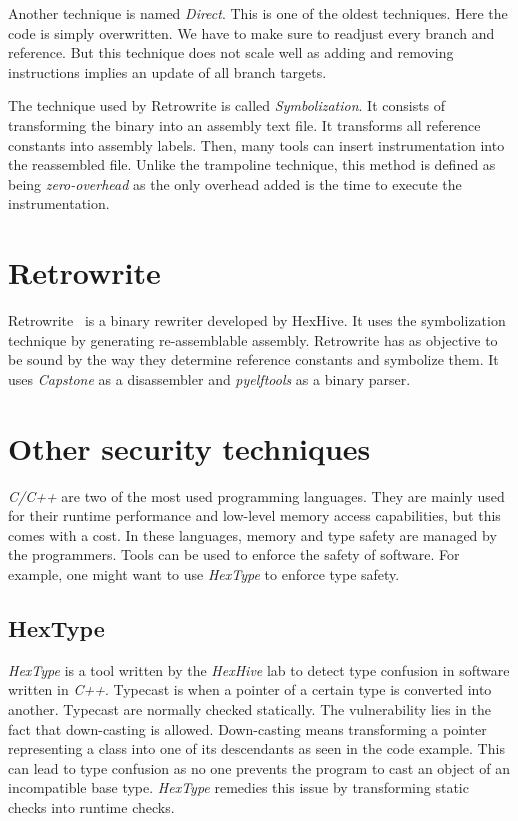 \documentclass[a4paper,11pt,oneside]{report}
\newcommand{\sysname}{Retrowrite\xspace}
\begin{document}
Another technique is named \textit{Direct}. This is one of the oldest
techniques. Here the code is simply overwritten. We have to make sure to readjust
every branch and reference.  But this technique does not scale well as adding
and removing instructions implies an update of all branch targets.


The technique used by \sysname is called \textit{Symbolization}. It
consists of transforming the binary into an assembly text file. It transforms
all reference constants into assembly labels. Then, many tools can insert
instrumentation into the reassembled file. Unlike the trampoline technique,
this method is defined as being \textit{zero-overhead} as the only overhead
added is the time to execute the instrumentation.


\section{Retrowrite}
Retrowrite~\cite{dinesh20oakland} is a binary rewriter developed by HexHive.
It uses the symbolization technique by generating re-assemblable assembly.
Retrowrite has as objective to be sound by the way they determine reference
constants and symbolize them. It uses
\textit{Capstone} as a disassembler and \textit{pyelftools} as a binary parser.

\section{Other security techniques}
\textit{C/C++} are two of the most used programming languages. They are
mainly used for their runtime performance and low-level memory access
capabilities, but this comes with a cost. In these languages, memory and type
safety are managed by the programmers. Tools can be used to enforce the safety
of software. For example, one might want to use \textit{HexType} to enforce
type safety.

\subsection{HexType}
\textit{HexType} is a tool written by the \textit{HexHive} lab to
detect type confusion in software written in \textit{C++}. Typecast is when a
pointer of a certain type is converted into another. Typecast are
normally checked statically. The vulnerability lies in the fact that
down-casting is allowed. Down-casting means transforming a pointer representing
a class into one of its descendants as seen in the code example. This can lead
to type confusion as no one prevents the program to cast an object of
an incompatible base type. \textit{HexType} remedies this issue by transforming
static checks into runtime checks.
\end{document}
